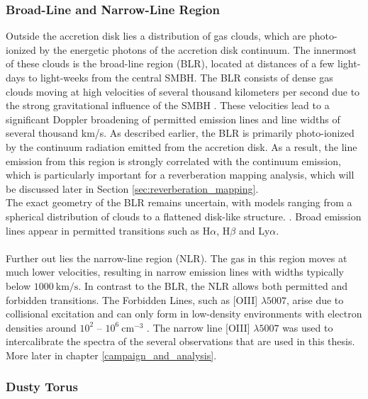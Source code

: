 \subsubsection{Broad-Line and Narrow-Line Region}

Outside the accretion disk lies a distribution of gas clouds, which are photo-ionized by the energetic photons of the accretion disk continuum. The innermost of these clouds is the broad-line region (BLR), located at distances of a few light-days to light-weeks from the central SMBH. The BLR consists of dense gas clouds moving at high velocities of several thousand kilometers per second due to the strong gravitational influence of the SMBH \parencite{netzer2013agn}. These velocities lead to a significant Doppler broadening of permitted emission lines and line widths of several thousand km/s. As described earlier, the BLR is primarily photo-ionized by the continuum radiation emitted from the accretion disk. As a result, the line emission from this region is strongly correlated with the continuum emission, which is particularly important for a reverberation mapping analysis, which will be discussed later in Section \ref{sec:reverberation_mapping}.\\ The exact geometry of the BLR remains uncertain, with models ranging from a spherical distribution of clouds to a flattened disk-like structure.  \parencite{netzer2013agn}. Broad emission lines appear in permitted transitions such as H$\alpha$, H$\beta$ and Ly$\alpha$. \parencite{peterson1997introduction}
\\\\
Further out lies the narrow-line region (NLR). The gas in this region moves at much lower velocities, resulting in narrow emission lines with widths typically below $1000 \ \mathrm{km/s}$. In contrast to the BLR, the NLR allows both permitted and forbidden transitions. The Forbidden Lines, such as [OIII] $\lambda5007$, arise due to collisional  excitation and can only form in low-density environments with electron densities around $10^2$ – $10^6 \ \mathrm{cm^{-3}}$ \parencite{osterbrock1989agn}. The narrow line [OIII] $\lambda5007$ was used to intercalibrate the spectra of the several observations that are used in this thesis. More later in chapter \ref{campaign_and_analysis}.




\subsubsection{Dusty Torus}

